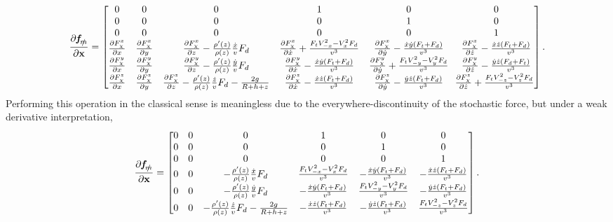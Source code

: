 \documentclass[11pt]{thesis}
\numberwithin{equation}{section}
\begin{document}
\begin{equation}
\pdv{\textit{\textbf{f}}_{\slashed{m}}}{\mathbf{x}} = 
\begin{bmatrix}
0 & 0 & 0 & 1 & 0 & 0 \\
0 & 0 & 0 & 0 & 1 & 0 \\
0 & 0 & 0 & 0 & 0 & 1 \\
\pdv{F_\chi^x}{x} & \pdv{F_{\chi}^x}{y} & \pdv{F_\chi^x}{z} - \frac{\rho'(z)}{\rho(z)}\frac{\dot{x}}{v}F_d & \pdv{F_\chi^x}{\dot{x}} + \frac{F_t V_{-x}^2  - V_x^2 F_d}{v^3} & \pdv{F_\chi^x}{\dot{y}} - \frac{\dot{x}\dot{y}(F_t + F_d)}{v^3} & \pdv{F_\chi^x}{\dot{z}} - \frac{\dot{x} \dot{z} \left(F_t + F_d\right)}{v^3} \\
\pdv{F_\chi^y}{x} & \pdv{F_\chi^y}{y} & \pdv{F_\chi^y}{z} - \frac{\rho'(z)}{\rho(z)}\frac{\dot{y}}{v}F_d & \pdv{F_\chi^y}{\dot{x}} - \frac{\dot{x}\dot{y}(F_t + F_d)}{v^3}  & \pdv{F_\chi^y}{\dot{y}} + \frac{F_t V_{-y}^2 - V_y^2 F_d}{v^3} & \pdv{F_\chi^y}{\dot{z}} - \frac{\dot{y} \dot{z} \left(F_d + F_t\right)}{v^3} \\
\pdv{F_\chi^z}{x} & \pdv{F_\chi^z}{y} & \pdv{F_\chi^z}{z} - \frac{\rho'(z)}{\rho(z)}\frac{\dot{z}}{v}F_d - \frac{2g}{R + h + z} & \pdv{F_\chi^z}{\dot{x}} - \frac{\dot{x} \dot{z} \left(F_t + F_d\right)}{v^3} & \pdv{F_\chi^z}{\dot{y}} - \frac{\dot{y} \dot{z} \left(F_t + F_d\right)}{v^3} & \!\!\pdv{F_\chi^z}{\dot{z}} + \frac{F_t V_{-z}^2 - V_z^2 F_d}{v^3}
\end{bmatrix}.
\end{equation}
Performing this operation in the classical sense is meaningless due to the everywhere-discontinuity of the stochastic force, but under a weak derivative interpretation,
\begin{equation}
\pdv{\textit{\textbf{f}}_{\slashed{m}}}{\mathbf{x}} = 
\begin{bmatrix}
0 & 0 & 0 & 1 & 0 & 0 \\
 0 & 0 & 0 & 0 & 1 & 0 \\
 0 & 0 & 0 & 0 & 0 & 1 \\
 0 & 0 & -\frac{\rho'(z)}{\rho(z)} \frac{\dot{x}}{v}F_d & \frac{F_t V_{-x}^2 - V_x^2 F_d}{v^3} & -\frac{\dot{x} \dot{y} \left(F_t + F_d\right)}{v^3} & -\frac{\dot{x} \dot{z} \left(F_t + F_d\right)}{v^3} \\
 0 & 0 & -\frac{\rho'(z)}{\rho(z)} \frac{\dot{y}}{v}F_d & -\frac{\dot{x} \dot{y} \left(F_t + F_d\right)}{v^3} & \frac{F_t
   V_{-y}^2 - V_y^2 F_d}{v^3} & -\frac{\dot{y} \dot{z} \left(F_t + F_d\right)}{v^3} \\
 0 & 0 & - \frac{\rho'(z)}{\rho(z)} \frac{\dot{z}}{v}F_d - \frac{2g}{R + h + z} & -\frac{\dot{x} \dot{z} \left(F_t + F_d\right)}{v^3} & -\frac{\dot{y} \dot{z} \left(F_t + F_d\right)}{v^3} & \frac{F_t V_{-z}^2 - V_z^2 F_d}{v^3}
\end{bmatrix}.
\end{equation}
\end{document}
